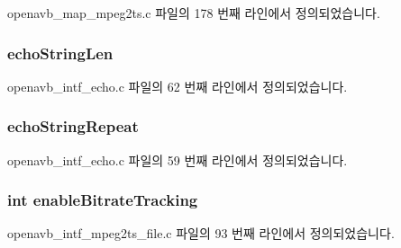openavb\+\_\+map\+\_\+mpeg2ts.\+c 파일의 178 번째 라인에서 정의되었습니다.

\subsubsection[{\texorpdfstring{echo\+String\+Len}{echoStringLen}}]{ echo\+String\+Len}\hypertarget{structpvt__data__t_aa21241dafcbc5ecb6ba1e93aa2036ade}{}\label{structpvt__data__t_aa21241dafcbc5ecb6ba1e93aa2036ade}


openavb\+\_\+intf\+\_\+echo.\+c 파일의 62 번째 라인에서 정의되었습니다.

\subsubsection[{\texorpdfstring{echo\+String\+Repeat}{echoStringRepeat}}]{ echo\+String\+Repeat}\hypertarget{structpvt__data__t_afaa2c983e5db55009bb2c195b5775dd4}{}\label{structpvt__data__t_afaa2c983e5db55009bb2c195b5775dd4}


openavb\+\_\+intf\+\_\+echo.\+c 파일의 59 번째 라인에서 정의되었습니다.

\subsubsection[{\texorpdfstring{enable\+Bitrate\+Tracking}{enableBitrateTracking}}]{\setlength{\rightskip}{0pt plus 5cm}int enable\+Bitrate\+Tracking}\hypertarget{structpvt__data__t_a0244b24ce315ab79c661e280c86933c2}{}\label{structpvt__data__t_a0244b24ce315ab79c661e280c86933c2}


openavb\+\_\+intf\+\_\+mpeg2ts\+\_\+file.\+c 파일의 93 번째 라인에서 정의되었습니다.

